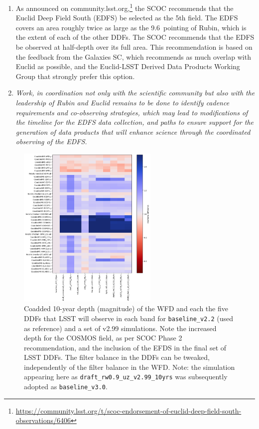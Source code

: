 \begin{enumerate}
\item As announced on community.lsst.org,\footnote{\url{https://community.lsst.org/t/scoc-endorsement-of-euclid-deep-field-south-observations/6406}} the SCOC recommends that the Euclid Deep Field South (EDFS) be selected as the 5th field. The EDFS covers an area roughly twice as large as the 9.6\degsq\ pointing of Rubin, which is the extent of each of the other DDFs. The SCOC recommends that the EDFS be observed at half-depth over its full area.
This recommendation is based on the feedback from the Galaxies SC, which recommends as much overlap with Euclid as possible, and the Euclid-LSST Derived Data Products Working Group \citep{https://doi.org/10.5281/zenodo.7195671} that strongly prefer this option. 

\item
 \emph{Work, in coordination not only with the scientific community but also with the leadership of Rubin and Euclid remains to be done to identify cadence requirements and co-observing strategies, which may lead to modifications of the timeline for the EDFS data collection, and paths to ensure support for the generation of data products that will enhance science through the coordinated observing of the EDFS.}


\end{enumerate}

\begin{figure}
    \centering
    \includegraphics[width=0.6\textwidth]{figures/ddf.png}
    \caption{Coadded 10-year depth (magnitude) of the WFD and each the five DDFs that LSST will observe in each band for \texttt{baseline\_v2.2} (used as reference) and a set of v2.99 simulations. Note the increased depth for the COSMOS field, as per SCOC Phase 2 recommendation, and the inclusion of the EFDS in the final set of LSST DDFs. The filter balance in the DDFs can be tweaked, independently of the filter balance in the WFD. Note: the simulation appearing here as \texttt{draft\_rw0.9\_uz\_v2.99\_10yrs} was subsequently adopted as \texttt{baseline\_v3.0}.}
    \label{fig:my_label}
\end{figure}